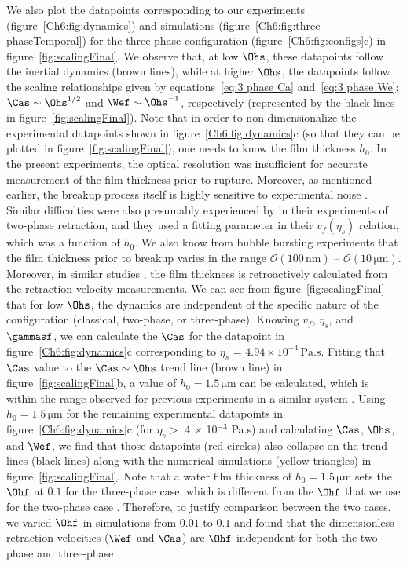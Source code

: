 We also plot the datapoints corresponding to our experiments (figure~\ref{Ch6:fig:dynamics}) and simulations (figure~\ref{Ch6:fig:three-phaseTemporal}) for the three-phase configuration (figure~\ref{Ch6:fig:configs}c) in figure~\ref{fig:scalingFinal}. We observe that, at low $\Ohs$, these datapoints follow the inertial dynamics (brown lines), while at higher $\Ohs$, the datapoints follow the scaling relationships given by equations~\eqref{eq:3 phase Ca} and~\eqref{eq:3 phase We}: $\Cas \sim \Ohs^{1/2}$ and $\Wef \sim \Ohs^{-1}$, respectively (represented by the black lines in figure~\ref{fig:scalingFinal}). Note that in order to non-dimensionalize the experimental datapoints shown in figure~\ref{Ch6:fig:dynamics}c (so that they can be plotted in figure~\ref{fig:scalingFinal}), one needs to know the film thickness $h_0$. In the present experiments, the optical resolution was insufficient for accurate measurement of the film thickness prior to rupture. Moreover, as mentioned earlier, the breakup process itself is highly sensitive to experimental noise \citep[see \S~4.2 of][]{villermaux2020fragmentation}. Similar difficulties were also presumably experienced by \citet{eri-2010-pre} in their experiments of two-phase retraction, and they used a fitting parameter in their $v_f (\eta_{s})$ relation, which was a function of $h_0$. We also know from bubble bursting experiments \citep{doubliez-1991-ijmf, lhuissier2012bursting} that the film thickness prior to breakup varies in the range $\mathcal{O}\left(100\,\si{\nano\meter}\right)$ -- $\mathcal{O}\left(10\,\si{\micro\meter}\right)$. Moreover, in similar studies \citep{lhuissier2012bursting, thoroddsen-2012-jfm}, the film thickness is retroactively calculated from the retraction velocity measurements. We can see from figure~\ref{fig:scalingFinal} that for low $\Ohs$, the dynamics are independent of the specific nature of the configuration (classical, two-phase, or three-phase). Knowing $v_f$, $\eta_{s}$, and $\gammasf$, we can calculate the $\Cas$ for the datapoint in figure~\ref{Ch6:fig:dynamics}c corresponding to $\eta_{s}$ = $4.94 \times 10^{-4}\,\si{\pascal}.\si{\second}$. Fitting that $\Cas$ value to the $\Cas \sim \Ohs$ trend line (brown line) in figure~\ref{fig:scalingFinal}b, a value of $h_0 = 1.5\,\si{\micro\meter}$ can be calculated, which is within the range observed for previous experiments in a similar system \citep{lhuissier2012bursting}. Using $h_0 = 1.5\,\si{\micro\meter}$ for the remaining experimental datapoints in figure~\ref{Ch6:fig:dynamics}c (for $\eta_{s} >$ 4 $\times$ 10$^{-3}$ Pa.s) and calculating $\Cas$, $\Ohs$, and $\Wef$, we find that those datapoints (red circles) also collapse on the trend lines (black lines) along with the numerical simulations (yellow triangles) in figure~\ref{fig:scalingFinal}. Note that a water film thickness of $h_0 = 1.5\,\si{\micro\meter}$ sets the $\Ohf$ at $0.1$ for the three-phase case, which is different from the $\Ohf$ that we use for the two-phase case \citep[$\Ohf = 0.05$ based on their experiments of][]{reyssat-2006-epl}. Therefore, to justify comparison between the two cases, we varied $\Ohf$ in simulations from $0.01$ to $0.1$ and found that the dimensionless retraction velocities ($\Wef$ and $\Cas$) are $\Ohf$-independent for both the two-phase and three-phase 